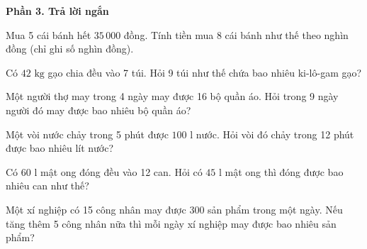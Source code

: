 \textbf{Phần 3. Trả lời ngắn}

\begin{ex} %
Mua 5 cái bánh hết $35\,000$ đồng. Tính tiền mua 8 cái bánh như thế theo nghìn đồng (chỉ ghi số nghìn đồng).
\end{ex}

\begin{ex} %
Có $42\text{ kg}$ gạo chia đều vào 7 túi. Hỏi 9 túi như thế chứa bao nhiêu ki-lô-gam gạo?
\end{ex}

\begin{ex} %
Một người thợ may trong 4 ngày may được 16 bộ quần áo. Hỏi trong 9 ngày người đó may được bao nhiêu bộ quần áo?
\end{ex}

\begin{ex} %
Một vòi nước chảy trong 5 phút được $100\text{ l}$ nước. Hỏi vòi đó chảy trong 12 phút được bao nhiêu lít nước?
\end{ex}

\begin{ex} %
Có $60\text{ l}$ mật ong đóng đều vào 12 can. Hỏi có $45\text{ l}$ mật ong thì đóng được bao nhiêu can như thế?
\end{ex}

\begin{ex} %
Một xí nghiệp có 15 công nhân may được 300 sản phẩm trong một ngày. Nếu tăng thêm 5 công nhân nữa thì mỗi ngày xí nghiệp may được bao nhiêu sản phẩm?
\end{ex}
